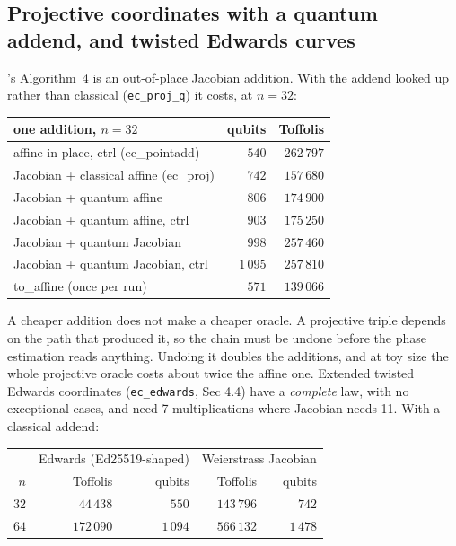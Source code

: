 \documentclass[11pt]{article}
\theoremstyle{plain}
\theoremstyle{remark}
\begin{document}
\subsection{Projective coordinates with a quantum addend, and twisted Edwards curves}

\cite{ec:kim26}'s Algorithm~4 is an out-of-place Jacobian addition. With the addend looked up rather
than classical (\texttt{ec\_proj\_q}) it costs, at $n=32$:

\begin{center}\small
\begin{tabular}{lrr}
\toprule
one addition, $n=32$ & qubits & Toffolis\\
\midrule
affine in place, ctrl (ec\_pointadd) & $540$ & $262\,797$\\
Jacobian + classical affine (ec\_proj) & $742$ & $157\,680$\\
Jacobian + quantum affine & $806$ & $174\,900$\\
Jacobian + quantum affine, ctrl & $903$ & $175\,250$\\
Jacobian + quantum Jacobian & $998$ & $257\,460$\\
Jacobian + quantum Jacobian, ctrl & $1\,095$ & $257\,810$\\
to\_affine (once per run) & $571$ & $139\,066$\\
\bottomrule
\end{tabular}
\end{center}

\noindent A cheaper addition does not make a cheaper oracle. A projective triple depends on the path
that produced it, so the chain must be undone before the phase estimation reads anything. Undoing
it doubles the additions, and at toy size the whole projective oracle costs about twice the affine
one. Extended twisted Edwards coordinates (\texttt{ec\_edwards}, \cite{ec:kim26} Sec 4.4) have a
\emph{complete} law, with no exceptional cases, and need 7 multiplications where Jacobian needs 11.
With a classical addend:

\begin{center}\small
\begin{tabular}{rrrrr}
\toprule
& \multicolumn{2}{c}{Edwards (Ed25519-shaped)} & \multicolumn{2}{c}{Weierstrass Jacobian}\\
$n$ & Toffolis & qubits & Toffolis & qubits\\
\midrule
$32$ & $44\,438$ & $550$ & $143\,796$ & $742$\\
$64$ & $172\,090$ & $1\,094$ & $566\,132$ & $1\,478$\\
\bottomrule
\end{tabular}
\end{center}
\end{document}
